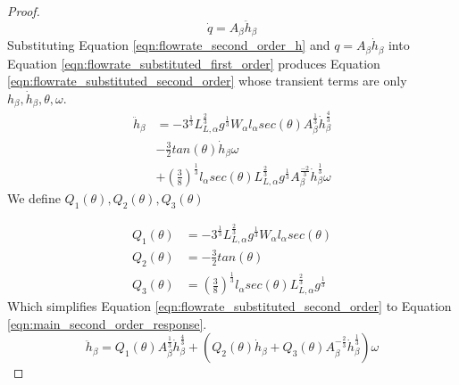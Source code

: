 \begin{proof}
\begin{equation}
\dot{q} = A_{\beta} \ddot{h}_{\beta}
\label{eqn:flowrate_second_order_h}
\end{equation}
Substituting Equation \eqref{eqn:flowrate_second_order_h} and $q = A_{\beta} \dot{h}_{\beta}$ into Equation \eqref{eqn:flowrate_substituted_first_order} produces Equation \eqref{eqn:flowrate_substituted_second_order} whose transient terms are only $h_{\beta},\dot{h}_{\beta},\theta,\omega$.
\begin{align}
\ddot{h}_{\beta} &= - 3^{\frac{1}{3}} L_{L,\alpha}^{\frac{2}{3}} g^{\frac{1}{3}}  W_{\alpha} l_{\alpha} sec(\theta) A_{\beta}^{\frac{1}{3}} \dot{h}_{\beta}^{\frac{4}{3}} \nonumber \\
&- \frac{3}{2} tan(\theta) \dot{h}_{\beta} \omega \nonumber \\
&+ \left( \frac{3}{8} \right)^{\frac{1}{3}}  l_{\alpha} sec(\theta) L_{L,\alpha}^{\frac{2}{3}} g^{\frac{1}{3}} A_{\beta}^{\frac{-2}{3}} \dot{h}_{\beta}^{\frac{1}{3}} \omega  \label{eqn:flowrate_substituted_second_order}
\end{align}
We define $Q_1(\theta), Q_2(\theta), Q_3(\theta)$

\begin{align}
Q_1(\theta) &=  - 3^{\frac{1}{3}} L_{L,\alpha}^{\frac{2}{3}} g^{\frac{1}{3}}  W_{\alpha} l_{\alpha} sec(\theta)  \\
Q_2(\theta) &= - \frac{3}{2} tan(\theta)  \\
Q_3(\theta) &= \left( \frac{3}{8} \right)^{\frac{1}{3}}  l_{\alpha} sec(\theta) L_{L,\alpha}^{\frac{2}{3}} g^{\frac{1}{3}} 
\end{align}
Which simplifies Equation \eqref{eqn:flowrate_substituted_second_order} to Equation \eqref{eqn:main_second_order_response}.
\begin{equation}
\ddot{h}_{\beta} =Q_1(\theta) A_{\beta}^{\frac{1}{3}} \dot{h}_{\beta}^{\frac{4}{3}} + \left( Q_2(\theta) \dot{h}_{\beta}  + Q_3(\theta) A_{\beta}^{-\frac{2}{3}} \dot{h}_{\beta}^{\frac{1}{3}} \right) \omega
\label{eqn:main_second_order_response}
\end{equation}
\end{proof}

\begin{comment}
c) Present thrm and proof that this model stays within the controllable region with our hybrid control structure given it starts in the required domain.
	Thm2: The proposed analytical model and resultant feedback control is valid in the domain $D_0$ specified by non-zero $x_2 = \dot{h} \neq 0$, and $x_3 = \theta \in (-\frac{\pi}{2}, \frac{\pi}{2})$. And our hybrid control keeps the system in $D_0$, for states starting within D_0 and the point (x_1, x_2=0, x_3=0).
  Proof: represent system states (x1,x2,x3) =(h,dh,th), provide domain for feedback linearization {x2!=0, x2&x3 !=0 simultaneously, x1 in (-pi/2,pi/2)}
\end{comment}

